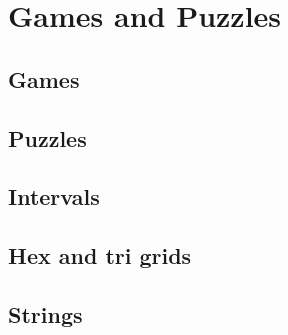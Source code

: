 
\chapter{Games and Puzzles}

\section{Games}
	
\section{Puzzles}

\section{Intervals}

\section{Hex and tri grids}

\section{Strings}
